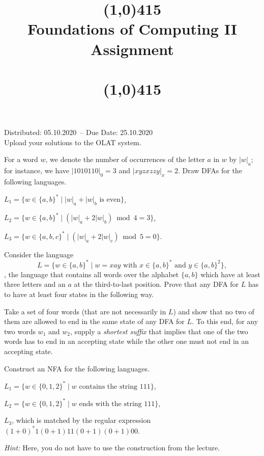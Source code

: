 \documentclass{exercise}
\title{\line(1,0){415}\\
  Foundations of Computing II\\
  \Large Assignment \theexercise\\[1em]
  \large{\topics}\\
  \line(1,0){415}}
\newcommand{\distdate}{05.10.2020}
\newcommand{\duedate}{25.10.2020}
\begin{document}
\maketitle

\begin{center}
  Distributed: \distdate\ -- Due Date: \duedate\\[1em]
  Upload your solutions to the OLAT system.\\[3em]
\end{center}


For a word $w$, we denote the number of occurrences of the letter $a$ in $w$ by $|w|_a$;
for instance, we have $|1010110|_0=3$ and $|xyzxzzy|_x=2$.  Draw DFAs for the following
languages.

\subtask $L_1=\{ w\in\{a,b\}^* \mid |w|_a + |w|_b \text { is even}\}$,


\subtask $L_2=\{ w\in\{a,b\}^* \mid (|w|_a+2|w|_b)\bmod 4 = 3 \}$,


\subtask $L_3=\{ w\in\{a,b,c\}^* \mid (|w|_a+2|w|_c)\bmod 5 = 0 \}$.



Consider the language
\[ L = \{ w\in\{a,b\}^* \mid w=xay \text{ with } x\in\{a,b\}^* \text{ and } y\in\{a,b\}^2\}, \]
\ie, the language that contains all words over the alphabet $\{a,b\}$ which
have at least three letters and an $a$ at the third-to-last position.  Prove
that any DFA for $L$ has to have at least four states in the following way.

Take a set of four words (that are not necessarily in $L$) and show that no two
of them are allowed to end in the same state of any DFA for $L$.  To this end, for
any two words $w_1$ and $w_2$, supply a \emph{shortest suffix} that implies that
one of the two words has to end in an accepting state while the other one must
not end in an accepting state. 



\subtask Construct an NFA for the following languages. 

  \begin{taskitems}
    \item $L_1=\{w\in\{0,1,2\}^*\mid w \text{ contains the string } 111\}$,
    \item $L_2=\{w\in\{0,1,2\}^*\mid w \text{ ends with the string } 111\}$,
    \item $L_3$, which is matched by the regular expression $(1+0)^*1(0+1)11(0+1)(0+1)00$.

    \smallskip
    \textit{Hint:} Here, you do not have to use the construction from the lecture.
  \end{taskitems}
\end{document}
